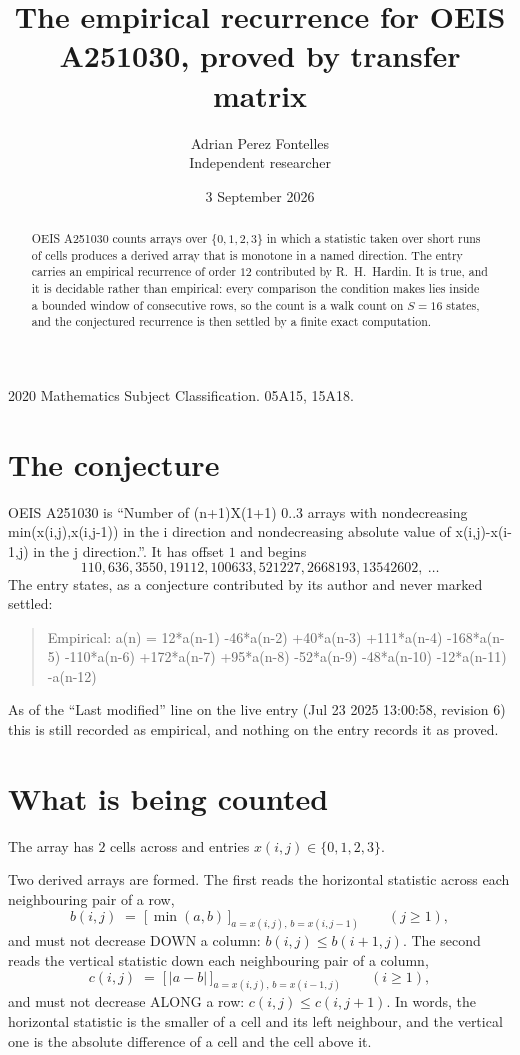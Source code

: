 \documentclass[11pt,a4paper]{article}
\title{The empirical recurrence for OEIS A251030, proved by transfer matrix}
\author{Adrian Perez Fontelles\\ \small Independent researcher}
\date{3 September 2026}
\theoremstyle{plain}
\theoremstyle{definition}
\begin{document}
\maketitle

\begin{abstract}
OEIS A251030 counts arrays over $\{0,1,2,3\}$ in which a statistic taken over short runs
of cells produces a derived array that is monotone in a named direction. The entry carries an
empirical recurrence of order $12$ contributed by R.~H.~Hardin. It is true, and it is
decidable rather than empirical: every comparison the condition makes lies inside a bounded
window of consecutive rows, so the count is a walk count on $S=16$ states, and the
conjectured recurrence is then settled by a finite exact computation.
\end{abstract}

\noindent\small 2020 Mathematics Subject Classification. 05A15, 15A18.\normalsize

\section{The conjecture}

OEIS A251030 is ``Number of (n+1)X(1+1) 0..3 arrays with nondecreasing min(x(i,j),x(i,j-1)) in the i direction and nondecreasing absolute value of x(i,j)-x(i-1,j) in the j direction.''. It has offset $1$ and begins
\[
110, 636, 3550, 19112, 100633, 521227, 2668193, 13542602,\ \dots
\]
The entry states, as a conjecture contributed by its author and never marked settled:
\begin{quote}
Empirical: a(n) = 12*a(n-1) -46*a(n-2) +40*a(n-3) +111*a(n-4) -168*a(n-5) -110*a(n-6) +172*a(n-7) +95*a(n-8) -52*a(n-9) -48*a(n-10) -12*a(n-11) -a(n-12)
\end{quote}
As of the ``Last modified'' line on the live entry (Jul 23 2025 13:00:58, revision 6) this is still
recorded as empirical, and nothing on the entry records it as proved.

\section{What is being counted}

The array has $2$ cells across and entries $x(i,j)\in\{0,1,2,3\}$.

Two derived arrays are formed. The first reads the horizontal statistic across each
neighbouring pair of a row,
\[
b(i,j)\;=\;\bigl[\,\min(a,b)\,\bigr]_{a=x(i,j),\,b=x(i,j-1)}\qquad (j\ge1),
\]
and must not decrease DOWN a column: $b(i,j)\le b(i{+}1,j)$. The second reads the vertical
statistic down each neighbouring pair of a column,
\[
c(i,j)\;=\;\bigl[\,\lvert a-b\rvert\,\bigr]_{a=x(i,j),\,b=x(i{-}1,j)}\qquad (i\ge1),
\]
and must not decrease ALONG a row: $c(i,j)\le c(i,j{+}1)$. In words, the horizontal statistic
is the smaller of a cell and its left neighbour, and the vertical one is
the absolute difference of a cell and the cell above it.
\end{document}
